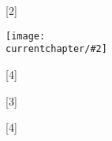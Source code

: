 \newcommand{\currentchapter}{}
\newcommand\image[2]{%
  \begin{figure}[H]%
    \centering%
    \texttt{[image: \\currentchapter/\#2]}%
  \end{figure}%
}
\WithSuffix\newcommand\image*[2]{%
  \begin{figure*}%
    \centering%
    \texttt{[image: \\currentchapter/\#2]}%
  \end{figure*}%
}
\newcommand\fig[4]{%
  \begin{figure}[H]%
    \centering%
    \texttt{[image: \\currentchapter/\#2]}%
    \caption{#3}\label{#4}%
  \end{figure}%
}
\WithSuffix\newcommand\fig*[4]{%
}
\newcommand\tbl[3]{%
  \begin{table}[H]%
    \centering%
    \caption{#2}\label{#3}%
  \end{table}%
}
\WithSuffix\newcommand\tbl*[3]{%
}
\newcommand\tikzfig[4]{%
  \begin{figure}[H]%
    \centering%
    \resizebox{#1\linewidth}{!}{}%
    \caption{#3}\label{#4}%
  \end{figure}%
}
\WithSuffix\newcommand\tikzfig*[4]{%
}

\newcommand{\newchapter}[1]{%
	\renewcommand{\currentchapter}{#1}
	
}

\newcommand{\matlab}{\textsc{Matlab}}
\newcommand{\email}[1]{\href{mailto:#1}{#1}}

\renewcommand{\algorithmicrequire}{\textbf{Input:}}
\renewcommand{\algorithmicensure}{\textbf{Output:}}

\DeclareMathOperator*{\argmin}{arg\,min}
\DeclareMathOperator*{\argmax}{arg\,max}
\newcommand{\enumber}[2]{{#1}\mathrm{e}{#2}}

\newcommand\blfootnote[1]{%
  \begingroup
  \renewcommand\thefootnote{}\footnote{#1}%
  \addtocounter{footnote}{-1}%
  \endgroup
}
